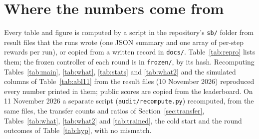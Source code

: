 \documentclass{article}
\begin{document}
\section{Where the numbers come from}\label{app:repro}
Every table and figure is computed by a script in the repository's \texttt{sb/} folder from result files that the
runs wrote (one JSON summary and one array of per-step rewards per run), or copied from a written record in
\texttt{docs/}. Table~\ref{tab:repro} lists them; the frozen controller of each round is in \texttt{frozen/}, by its
hash. Recomputing Tables~\ref{tab:main}, \ref{tab:what}, \ref{tab:stats} and \ref{tab:what2} and the simulated
columns of Table~\ref{tab:abl11} from the result files (10 November 2026) reproduced every number printed in them;
public scores are copied from the leaderboard. On 11 November 2026 a separate script (\texttt{audit/recompute.py})
recomputed, from the same files, the transfer counts and ratios of Section~\ref{sec:transfer},
Tables~\ref{tab:what}, \ref{tab:what2} and \ref{tab:trained}, the cold start and the round outcomes of
Table~\ref{tab:hyp}, with no mismatch.
\end{document}
